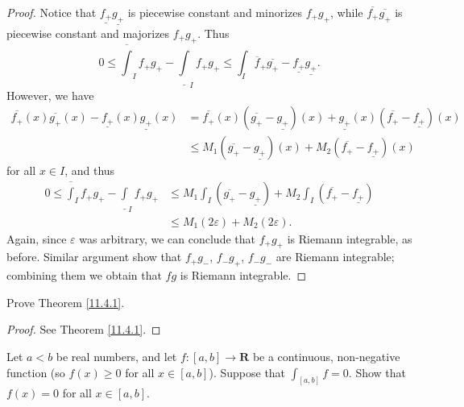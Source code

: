 \begin{proof}
    Notice that \(\underline{f_+} \underline{g_+}\) is piecewise constant and minorizes \(f_+ g_+\), while \(\overline{f_+} \overline{g_+}\) is piecewise constant and majorizes \(f_+ g_+\).
    Thus
    \[
        0 \leq \overline{\int}_I f_+ g_+ - \underline{\int}_I f_+ g_+ \leq \int_I \overline{f}_+ \overline{g_+} - \underline{f_+} \underline{g_+}.
    \]
    However, we have
    \begin{align*}
        \overline{f_+}(x) \overline{g_+}(x) - \underline{f_+}(x) \underline{g_+}(x) & = \overline{f_+}(x) (\overline{g_+} - \underline{g_+})(x) + \underline{g_+}(x) (\overline{f_+} - \underline{f_+})(x) \\
                                                                                    & \leq M_1 (\overline{g_+} - \underline{g_+})(x) + M_2 (\overline{f_+} - \underline{f_+})(x)
    \end{align*}
    for all \(x \in I\), and thus
    \begin{align*}
        0 \leq \overline{\int}_I f_+ g_+ - \underline{\int}_I f_+ g_+ & \leq M_1 \int_I (\overline{g_+} - \underline{g_+}) + M_2 \int_I (\overline{f_+} - \underline{f_+}) \\
                                                                      & \leq M_1 (2\varepsilon) + M_2 (2\varepsilon).
    \end{align*}
    Again, since \(\varepsilon\) was arbitrary, we can conclude that \(f_+ g_+\) is Riemann integrable, as before.
    Similar argument show that \(f_+ g_-\), \(f_- g_+\), \(f_- g_-\) are Riemann integrable;
    combining them we obtain that \(fg\) is Riemann integrable.
\end{proof}

\exercisesection

\begin{exercise}\label{ex 11.4.1}
    Prove Theorem \ref{11.4.1}.
\end{exercise}

\begin{proof}
    See Theorem \ref{11.4.1}.
\end{proof}

\begin{exercise}\label{ex 11.4.2}
    Let \(a < b\) be real numbers, and let \(f : [a, b] \to \mathbf{R}\) be a continuous, non-negative function
    (so \(f(x) \geq 0\) for all \(x \in [a, b]\)).
    Suppose that \(\int_{[a, b]} f = 0\).
    Show that \(f(x) = 0\) for all \(x \in [a, b]\).
\end{exercise}

